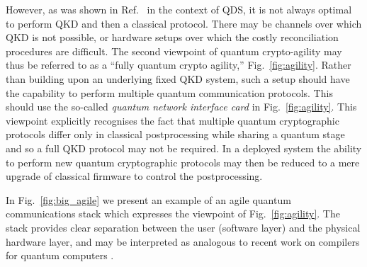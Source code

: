 However, as was shown in Ref.~\cite{Amiri2016} in the context of QDS, it is not always optimal to perform QKD and then a classical protocol. There may be channels over which QKD is not possible, or hardware setups over which the costly reconciliation procedures are difficult. The second viewpoint of quantum crypto-agility may thus be referred to as a ``fully quantum crypto agility,'' Fig.~\ref{fig:agility}. Rather than building upon an underlying fixed QKD system, such a setup should have the capability to perform multiple quantum communication protocols. This should use the so-called \emph{quantum network interface card} in Fig.~\ref{fig:agility}. This viewpoint explicitly recognises the fact that multiple quantum cryptographic protocols differ only in classical postprocessing while sharing a quantum stage and so a full QKD protocol may not be required. %
In a deployed system the ability to perform new quantum cryptographic protocols may then be reduced to a mere upgrade of classical firmware to control the postprocessing.



In Fig.~\ref{fig:big_agile} we present an example of an agile quantum communications stack which expresses the viewpoint of Fig.~\ref{fig:agility}. The stack provides clear separation between the user (software layer) and the physical hardware layer, and may be interpreted as analogous to recent work on compilers for quantum computers \cite{Killoran2018, qiskit, Murali2019}.

\iffalse
\begin{adjustwidth}{-6cm}{0cm}
\begin{figure}[htp]
\floatbox[{\capbeside\thisfloatsetup{capbesideposition={left,top},capbesidewidth=6cm}}]{figure}[\FBwidth]
{\caption{\label{fig:big_agile} Agile quantum communications stack following the viewpoint of Fig.~\ref{fig:agility}\extrafig{c}. The \emph{user app} layer allows a user to select a task they wish to perform, (e.g. message encryption, message authentication, secret sharing). The agile middleware provides a separation between the user (software) and underlying quantum crypto-system (hardware). The \emph{primitive} layer selects the desired cryptographic primitive (e.g. QKD, QDS, QSS, RSA), and instructs the \emph{protocol \& hardware abstraction} layer to run the protocol via a library of known functions (e.g. ``send coherent state,'' ``perform heterodyne detection''). These commands are interpreted by the \emph{hardware} layer and sent to the physical hardware setup. The agile system should be flexible and allow for switching between different tasks, different protocols and different hardware setups. \emph{Picture credit: Stefan Richter in Ref.~\cite{Richter2020}}}}
{\texttt{[image: aqc/layers\_5]}}
\end{figure}
\end{adjustwidth}
\fi

